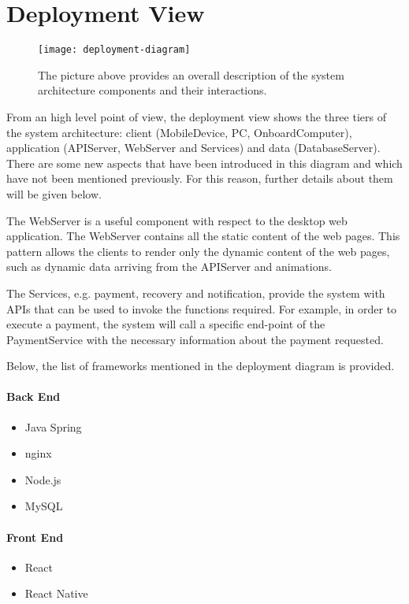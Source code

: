 \section{Deployment View}

\begin{figure}[H]
	\centering
	\texttt{[image: deployment-diagram]}
	\caption[Deployment Diagram]{The picture above provides an overall description of the system architecture components and their interactions.}
	\label{fig:deployment}
\end{figure}

From an high level point of view, the deployment view shows the three tiers of the system architecture: client (MobileDevice, PC, OnboardComputer), application (APIServer, WebServer and Services) and data (DatabaseServer). There are some new aspects that have been introduced in this diagram and which have not been mentioned previously. For this reason, further details about them will be given below.

The WebServer is a useful component with respect to the desktop web application. The WebServer contains all the static content of the web pages. This pattern allows the clients to render only the dynamic content of the web pages, such as dynamic data arriving from the APIServer and animations.

The Services, e.g. payment, recovery and notification, provide the system with APIs that can be used to invoke the functions required. For example, in order to execute a payment, the system will call a specific end-point of the PaymentService with the necessary information about the payment requested.

Below, the list of frameworks mentioned in the deployment diagram is provided.

\paragraph{Back End}
\begin{itemize}
	\item Java Spring \cite{spring}
	\item nginx \cite{nginx}
	\item Node.js \cite{nodejs}
	\item MySQL {\cite{mysql}}
\end{itemize}

\paragraph{Front End}
\begin{itemize}
	\item React \cite{react}
	\item React Native \cite{react-native}
\end{itemize}
